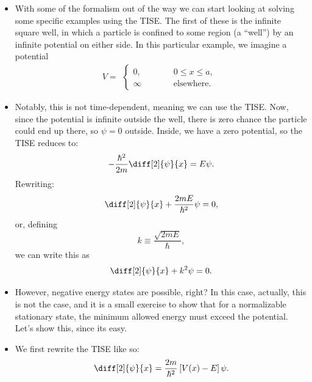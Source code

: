 \begin{itemize}
    \item With some of the formalism out of the way we can start looking at solving some specific examples using the TISE. The first of these is the infinite square well, in which a particle is confined to some region (a ``well'') by an infinite potential on either side. In this particular example, we imagine a potential
        \begin{equation*}
            V = 
                \begin{alignedat}{1}
                \begin{cases}
                    0,\qquad\quad &0 \leq x \leq a, \\
                    \infty & \text{elsewhere}.
                \end{cases}
            \end{alignedat}
        \end{equation*}
    \item Notably, this is not time-dependent, meaning we can use the TISE. Now, since the potential is infinite outside the well, there is zero chance the particle could end up there, so $\psi=0$ outside. Inside, we have a zero potential, so the TISE reduces to:
        \begin{equation*}
            -\frac{\hbar^2}{2m}\diff[2]{\psi}{x} = E\psi.
        \end{equation*}
        Rewriting:
        \begin{equation*}
            \diff[2]{\psi}{x} + \frac{2mE}{\hbar^2}\psi = 0,
        \end{equation*}
        or, defining
        \begin{equation*}
            k \equiv \frac{\sqrt{2mE}}{\hbar},
        \end{equation*}
        we can write this as
        \begin{equation*}
            \diff[2]{\psi}{x} + k^2\psi = 0.
        \end{equation*}
    \item However, negative energy states are possible, right? In this case, actually, this is not the case, and it is a small exercise to show that for a normalizable stationary state, the minimum allowed energy must exceed the potential. Let's show this, since its easy.
    \item We first rewrite the TISE like so:
        \begin{equation*}
            \diff[2]{\psi}{x} = \frac{2m}{\hbar^2} \left[V(x) - E\right]\psi.

\end{equation*}
\end{itemize}
